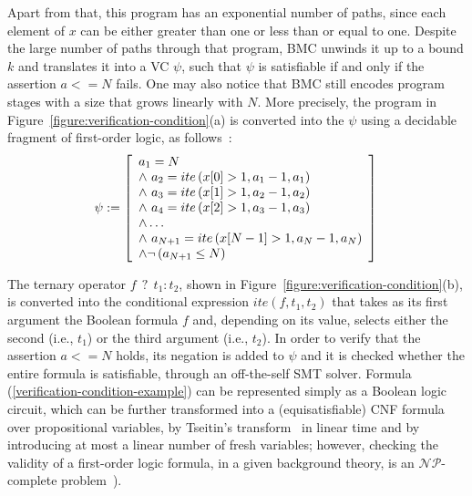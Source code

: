 \documentclass[format=acmsmall, review=false, screen=true]{acmart}
\begin{document}
Apart from that, this program has an exponential number of paths, since each element of $x$ can be either greater than one or less than or equal to one. Despite the large number of paths through that program, BMC unwinds it up to a bound $k$ and translates it into a VC $\psi$, such that $\psi$ is satisfiable if and only if the assertion $a<=N$ fails. One may also notice that BMC still encodes program stages with a size that grows linearly with $N$. More precisely, the program in Figure~\ref{figure:verification-condition}(a) is converted into the $\psi$ using a decidable fragment of first-order logic, as follows~\cite{Bradley07}:
%
\begin{equation}              
\label{verification-condition-example}
\psi := \left [ \begin{array}{ll} 
                a_{1} = N  \\
                \wedge \, \, a_{2} = ite\left(x[0] > 1, a_{1} - 1, a_{1}\right) \\ 
                \wedge \, \, a_{3} = ite\left(x[1] > 1, a_{2} - 1, a_{2}\right) \\
                \wedge \, \, a_{4} = ite\left(x[2] > 1, a_{3} - 1, a_{3}\right) \\
                \wedge \ldots \\
                \wedge \, \, a_{N+1} = ite\left(x[N-1] > 1, a_{N} - 1 , a_{N}\right) \\
                \wedge \neg \left(a_{N+1} \leq N\right) \\
              \end{array} \right ]  \\
              \\           
\end{equation}

The ternary operator $f \: \: ? \: \: t_1 : t_2$, shown in Figure~\ref{figure:verification-condition}(b), is converted into the conditional expression $\mathit{ite}(f, t_1, t_2)$ that takes as its first argument the Boolean formula $f$ and, depending on its value, selects either the second (i.e., $t_1$) or the third argument (i.e., $t_2$). In order to verify that the assertion $a<=N$ holds, its negation is added to $\psi$ and it is checked whether the entire formula is satisfiable, through an off-the-self SMT solver. Formula (\ref{verification-condition-example}) can be represented simply as a Boolean logic circuit, which can be further transformed into a (equisatisfiable) CNF formula over propositional variables, by Tseitin's transform~\cite{Tseitin83} in linear time and by introducing at most a linear number of fresh variables; however, checking the validity of a first-order logic formula, in a given background theory, is an ${\mathcal{NP}}$-complete problem~\cite{PatarinG97}).
\end{document}
